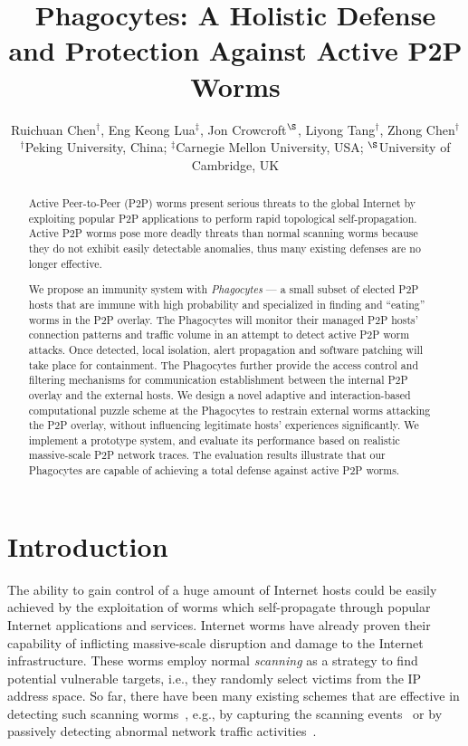 \documentclass[times,10pt,twocolumn]{article}
\begin{document}
\title{Phagocytes: A Holistic Defense and Protection Against Active P2P Worms}

\author{Ruichuan Chen$^\dag$, Eng Keong Lua$^\ddag$, Jon Crowcroft$^\S$, Liyong Tang$^\dag$, Zhong Chen$^\dag$\\
$^\dag$Peking University, China; $^\ddag$Carnegie Mellon University,
USA; $^\S$University of Cambridge, UK}

\maketitle
\thispagestyle{empty}

\begin{abstract}

Active Peer-to-Peer (P2P) worms present serious threats to the
global Internet by exploiting popular P2P applications to perform
rapid topological self-propagation. Active P2P worms pose more
deadly threats than normal scanning worms because they do not
exhibit easily detectable anomalies, thus many existing defenses are
no longer effective.

We propose an immunity system with \emph{Phagocytes} --- a small
subset of elected P2P hosts that are immune with high probability
and specialized in finding and ``eating'' worms in the P2P overlay.
The Phagocytes will monitor their managed P2P hosts' connection
patterns and traffic volume in an attempt to detect active P2P worm
attacks. Once detected, local isolation, alert propagation and
software patching will take place for containment. The Phagocytes
further provide the access control and filtering mechanisms for
communication establishment between the internal P2P overlay and the
external hosts. We design a novel adaptive and interaction-based
computational puzzle scheme at the Phagocytes to restrain external
worms attacking the P2P overlay, without influencing legitimate
hosts' experiences significantly. We implement a prototype system,
and evaluate its performance based on realistic massive-scale P2P
network traces. The evaluation results illustrate that our
Phagocytes are capable of achieving a total defense against active
P2P worms.

\end{abstract}


\section{Introduction}

The ability to gain control of a huge amount of Internet hosts could
be easily achieved by the exploitation of worms which self-propagate
through popular Internet applications and services. Internet worms
have already proven their capability of inflicting massive-scale
disruption and damage to the Internet infrastructure. These worms
employ normal \emph{scanning} as a strategy to find potential
vulnerable targets, i.e., they randomly select victims from the IP
address space. So far, there have been many existing schemes that
are effective in detecting such scanning worms~\cite{li08survey},
e.g., by capturing the scanning events~\cite{VirtualHpot:Provos2004}
or by passively detecting abnormal network traffic
activities~\cite{Portscant:Jung2004}.
\end{document}
